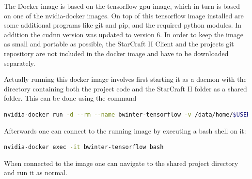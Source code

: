The Docker image is based on the tensorflow-gpu image, which in turn is based on one of the nvidia-docker images. On top of this tensorflow image installed are some additional programs like git and pip, and the required python modules. In addition the cudnn version was updated to version 6. In order to keep the image as small and portable as possible, the StarCraft II Client and the projects git repository are not included in the docker image and have to be downloaded separately.

Actually running this docker image involves first starting it as a daemon with the directory containing both the project code and the StarCraft II folder as a shared folder. This can be done using the command 

\begin{lstlisting}[language=bash]
nvidia-docker run -d --rm --name bwinter-tensorflow -v /data/home/$USER:/data/local/home/$USER bwinter-tensorflow:latest
\end{lstlisting}

Afterwards one can connect to the running image by executing a bash shell on it:
\begin{lstlisting}[language=bash]
nvidia-docker exec -it bwinter-tensorflow bash
\end{lstlisting}

When connected to the image one can navigate to the shared project directory and run it as normal.
